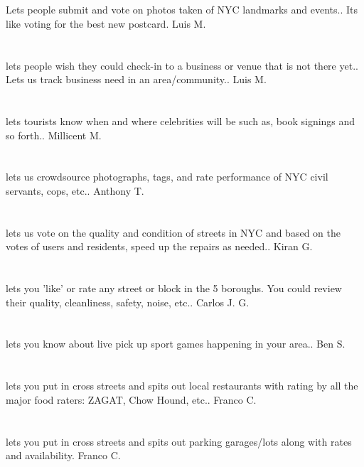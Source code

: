 \section{}Lets people submit and vote on photos taken of NYC landmarks and events.. Its like voting for the best new postcard. Luis M.
\section{}lets people wish they could check-in to a business or venue that is not there yet.. Lets us track business need in an area/community.. Luis M.
\section{}lets tourists know when and where celebrities will be such as,  book signings and so forth.. Millicent M.
\section{}lets us crowdsource photographs,  tags,  and rate performance of NYC civil servants,  cops,  etc.. Anthony T.
\section{}lets us vote on the quality and condition of streets in NYC and based on the votes of users and residents,  speed up the repairs as needed.. Kiran G.
\section{}lets you 'like' or rate any street or block in the 5 boroughs. You could review their quality,  cleanliness,  safety,  noise,  etc.. Carlos J.  G.
\section{}lets you know about live pick up sport games happening in your area.. Ben S.
\section{}lets you put in cross streets and spits out local restaurants with rating by all the major food raters:  ZAGAT,  Chow Hound,  etc.. Franco C.
\section{}lets you put in cross streets and spits out parking garages/lots  along with rates and availability. Franco C.

